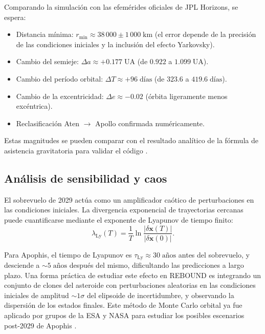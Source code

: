 \documentclass[a4paper]{article}
\begin{document}
Comparando la simulación con las efemérides oficiales de JPL Horizons, se espera:

\begin{itemize}
  \item Distancia mínima: $r_\text{min} \approx 38\,000 \pm 1\,000\;\text{km}$ (el error depende de la precisión de las condiciones iniciales y la inclusión del efecto Yarkovsky).
  \item Cambio del semieje: $\Delta a \approx +0.177\;\text{UA}$ (de $0.922$ a $1.099\;\text{UA}$).
  \item Cambio del período orbital: $\Delta T \approx +96\;\text{días}$ (de $323.6$ a $419.6\;\text{días}$).
  \item Cambio de la excentricidad: $\Delta e \approx -0.02$ (órbita ligeramente menos excéntrica).
  \item Reclasificación Aten $\to$ Apollo confirmada numéricamente.
\end{itemize}

Estas magnitudes se pueden comparar con el resultado analítico de la fórmula de asistencia gravitatoria para validar el código \cite{scheeres2023proximity, murray1999solar}.

\subsection{Análisis de sensibilidad y caos}

El sobrevuelo de 2029 actúa como un amplificador caótico de perturbaciones en las condiciones iniciales. La divergencia exponencial de trayectorias cercanas puede cuantificarse mediante el exponente de Lyapunov de tiempo finito:
\begin{equation}
  \lambda_\text{Ly}(T) = \frac{1}{T}\ln\frac{|\delta\mathbf{x}(T)|}{|\delta\mathbf{x}(0)|}.
\end{equation}

Para Apophis, el tiempo de Lyapunov es $\tau_\text{Ly} \approx 30\;\text{años}$ antes del sobrevuelo, y desciende a $\sim 5\;\text{años}$ después del mismo, dificultando las predicciones a largo plazo. Una forma práctica de estudiar este efecto en REBOUND es integrando un conjunto de clones del asteroide con perturbaciones aleatorias en las condiciones iniciales de amplitud $\sim 1\sigma$ del elipsoide de incertidumbre, y observando la dispersión de los estados finales. Este método de Monte Carlo orbital ya fue aplicado por grupos de la ESA y NASA para estudiar los posibles escenarios post-2029 de Apophis \cite{farnocchia2023orbit, esa2024ramses}.
\end{document}

